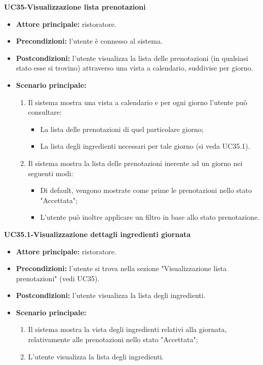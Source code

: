 \textbf{UC35-Visualizzazione lista prenotazioni}
\begin{itemize}
\item \textbf{Attore principale:} ristoratore.
\item \textbf{Precondizioni:} l'utente è connesso al sistema.
\item \textbf{Postcondizioni:} l'utente visualizza la lista delle prenotazioni (in qualsiasi stato esse si trovino) attraverso una vista a calendario, suddivise per giorno.
\item \textbf{Scenario principale:}
\begin{enumerate}
    \item Il sistema mostra una vista a calendario e per ogni giorno l'utente può consultare:
    \begin{itemize}
        \item La lista delle prenotazioni di quel particolare giorno;
        \item La lista degli ingredienti necessari per tale giorno (si veda UC35.1).
    \end{itemize}
    \item Il sistema mostra la lista delle prenotazioni inerente ad un giorno nei seguenti modi:
    \begin{itemize}
        \item Di default, vengono mostrate come prime le prenotazioni nello stato "Accettata";
        \item L'utente può inoltre applicare un filtro in base allo stato prenotazione.
    \end{itemize}
\end{enumerate}
\end{itemize}

\textbf{UC35.1-Visualizzazione dettagli ingredienti giornata}
\begin{itemize}
\item \textbf{Attore principale:} ristoratore.
\item \textbf{Precondizioni:} l'utente si trova nella sezione "Visualizzazione lista prenotazioni" (vedi UC35).
\item \textbf{Postcondizioni:} l'utente visualizza la lista degli ingredienti.
\item \textbf{Scenario principale:}
\begin{enumerate}
    \item Il sistema mostra la vista degli ingredienti relativi alla giornata, relativamente alle prenotazioni nello stato "Accettata";
    \item L'utente visualizza la lista degli ingredienti.
\end{enumerate}
\end{itemize}


